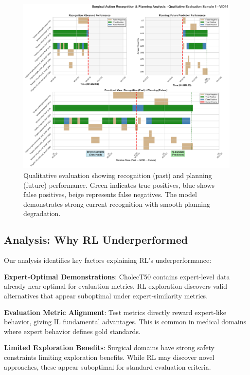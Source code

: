 \documentclass[runningheads]{llncs}
\begin{document}
\begin{figure}[h]
\centering
\includegraphics[width=\textwidth]{VID14_preds_sample_1.png}
\caption{Qualitative evaluation showing recognition (past) and planning (future) performance. Green indicates true positives, blue shows false positives, beige represents false negatives. The model demonstrates strong current recognition with smooth planning degradation.}
\label{fig:qualitative}
\end{figure}

\subsection{Analysis: Why RL Underperformed}

Our analysis identifies key factors explaining RL's underperformance:

\textbf{Expert-Optimal Demonstrations}: CholecT50 contains expert-level data already near-optimal for evaluation metrics. RL exploration discovers valid alternatives that appear suboptimal under expert-similarity metrics.

\textbf{Evaluation Metric Alignment}: Test metrics directly reward expert-like behavior, giving IL fundamental advantages. This is common in medical domains where expert behavior defines gold standards.

\textbf{Limited Exploration Benefits}: Surgical domains have strong safety constraints limiting exploration benefits. While RL may discover novel approaches, these appear suboptimal for standard evaluation criteria.
\end{document}
